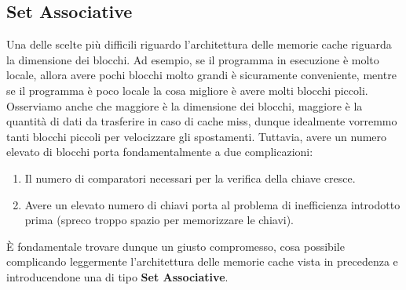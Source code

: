 \subsection{Set Associative}
Una delle scelte più difficili riguardo l'architettura delle memorie cache riguarda la dimensione dei blocchi. Ad esempio, se il programma in esecuzione è molto locale, allora avere pochi blocchi molto grandi è sicuramente conveniente, mentre se il programma è poco locale la cosa migliore è avere molti blocchi piccoli. Osserviamo anche che maggiore è la dimensione dei blocchi, maggiore è la quantità di dati da trasferire in caso di cache miss, dunque idealmente vorremmo tanti blocchi piccoli per velocizzare gli spostamenti. Tuttavia, avere un numero elevato di blocchi porta fondamentalmente a due complicazioni:
\begin{enumerate}
    \item Il numero di comparatori necessari per la verifica della chiave cresce.
    \item Avere un elevato numero di chiavi porta al problema di inefficienza introdotto prima (spreco troppo spazio per memorizzare le chiavi).
\end{enumerate}

\MakeUppercase{è} fondamentale trovare dunque un giusto compromesso, cosa possibile complicando leggermente l'architettura delle memorie cache vista in precedenza e introducendone una di tipo \textbf{Set Associative}.